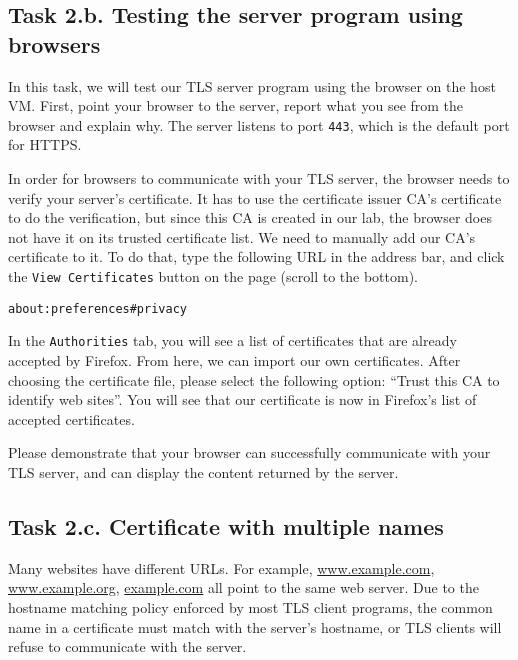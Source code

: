 \subsection{Task 2.b. Testing the server program using browsers}


In this task, we will test our TLS server program using the browser on the host VM.  
First, point your browser to the server, report what you see from the browser and explain why.
The server listens to port \texttt{443}, which is the default port for 
HTTPS. 

In order for browsers to communicate with your TLS server, the 
browser needs to verify your server's certificate. It has to use 
the certificate issuer CA's certificate to do the verification, but 
since this CA is created in our lab, the browser does not have it 
on its trusted certificate list. 
We need to manually add our CA's certificate to it.
To do that, type the following URL in the address bar, 
and click the \texttt{View Certificates} button
on the page (scroll to the bottom).

\begin{lstlisting}
about:preferences#privacy
\end{lstlisting}

In the \texttt{Authorities} tab,  you will see a list of certificates
that are already accepted by Firefox. From here, we
can import our own certificates. After choosing the certificate
file, please select the following option: ``Trust this CA to identify web sites''.
You will see that our certificate is now in Firefox's list of
accepted certificates.


Please demonstrate that your browser can successfully communicate with
your TLS server, and can display the content returned by the server. 



\subsection{Task 2.c. Certificate with multiple names}

Many websites have different URLs. For example, \url{www.example.com},
\url{www.example.org}, \url{example.com} all point to the same 
web server. Due to the hostname matching policy 
enforced by most TLS client programs, the common name in a certificate 
must match with the server's hostname, or TLS clients
will refuse to communicate with the server. 


